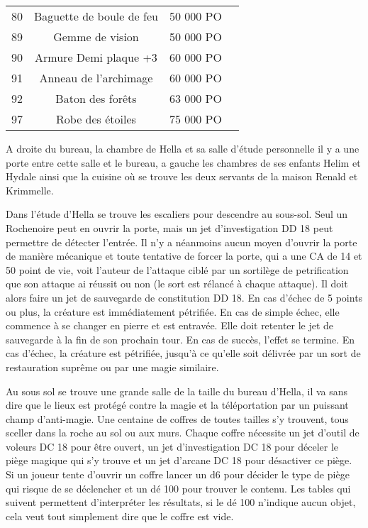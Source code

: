 \begin{table*} [tb]
\begin{tabular}{cccc}
   \rowcolor{LightCyan}
  80 & Baguette de boule de feu    &     50 000 PO & \pageref{} \\
  89 & Gemme de vision             &     50 000 PO & \pageref{} \\
   \rowcolor{LightCyan}
  90 & Armure Demi plaque +3       &     60 000 PO & \pageref{} \\
  91 & Anneau de l'archimage       &     60 000 PO & \pageref{} \\
   \rowcolor{LightCyan}
  92 & Baton des forêts            &     63 000 PO & \pageref{} \\
  97 & Robe des étoiles            &     75 000 PO & \pageref{} \\
\end{tabular}
    \setlength{\tabcolsep}{6pt}
\end{table*}

 
A droite du bureau, la chambre de Hella et sa salle d'étude personnelle
il y a une porte entre cette salle et le bureau, a gauche les chambres
de ses enfants Helim et Hydale ainsi que la cuisine où se trouve les deux
servants de la maison Renald et Krimmelle.

Dans l'étude d'Hella se trouve les escaliers pour descendre au sous-sol.
Seul un Rochenoire peut en ouvrir la porte, mais un jet d'investigation DD 18
peut permettre de détecter l'entrée. Il n'y a néanmoins aucun moyen 
d'ouvrir la porte de manière mécanique et toute tentative de forcer la 
porte, qui a une CA de 14 et 50 point de vie, voit l'auteur de l'attaque 
ciblé par un sortilège de petrification que son attaque ai réussit ou non 
(le sort est rélancé à chaque attaque). Il doit 
alors faire un jet de sauvegarde de constitution DD 18. En cas d'échec de 5 points ou 
plus, la créature est immédiatement pétrifiée. En cas de simple échec, 
elle commence à se changer en pierre et est entravée. Elle doit retenter 
le jet de sauvegarde à la fin de son prochain tour. En cas de succès, 
l'effet se termine. En cas d'échec, la créature est pétrifiée, jusqu'à 
ce qu'elle soit délivrée par un sort de restauration suprême ou par une 
magie similaire. 

Au sous sol se trouve une grande salle de la taille du bureau d'Hella, il 
va sans dire que le lieux est protégé contre la magie et la téléportation
par un puissant champ d'anti-magie. Une centaine de coffres de toutes tailles 
s'y trouvent, tous sceller dans la roche au sol ou aux murs. Chaque coffre
nécessite un jet d'outil de voleurs DC 18 pour être ouvert, un jet 
d'investigation DC 18 pour déceler le piège magique qui s'y trouve et un
jet d'arcane DC 18 pour désactiver ce piège. Si un joueur tente d'ouvrir
un coffre lancer un d6 pour décider le type de piège qui risque de se 
déclencher et un dé 100 pour trouver le contenu. Les tables qui suivent 
permettent d'interpréter les résultats, si le dé 100 n'indique aucun
objet, cela veut tout simplement dire que le coffre est vide.


